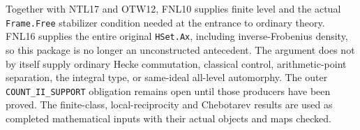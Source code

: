 Together with NTL17 and OTW12, FNL10 supplies finite level and the actual
\texttt{Frame.Free} stabilizer condition needed at the entrance to
ordinary theory.  FNL16 supplies the entire original
\texttt{HSet.Ax}, including inverse-Frobenius density, so this package
is no longer an unconstructed antecedent.  The argument does not by
itself supply ordinary Hecke commutation, classical control,
arithmetic-point separation, the integral type, or same-ideal all-level
automorphy.  The outer \texttt{COUNT\_II\_SUPPORT} obligation remains
open until those producers have been proved.  The finite-class,
local-reciprocity and Chebotarev results are used as completed
mathematical inputs with their actual objects and maps checked.
